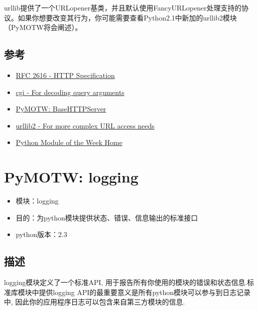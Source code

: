 \documentclass[letterpaper,10pt,english]{manual}
\begin{document}
urllib提供了一个URLopener基类，并且默认使用FancyURLopener处理支持的协议。如果你想要改变其行为，你可能需要查看Python2.1中新加的urllib2模块（PyMOTW将会阐述）。


\subsection{参考}
\begin{itemize}
\item {} 
\href{http://www.faqs.org/rfcs/rfc2616.html}{RFC 2616 - HTTP Specification}

\item {} 
\href{http://docs.python.org/lib/module-cgi.html}{cgi - For decoding query arguments}

\item {} 
\href{http://blog.doughellmann.com/2007/12/pymotw-basehttpserver.html}{PyMOTW: BaseHTTPServer}

\item {} 
\href{http://docs.python.org/lib/module-urllib2.html}{urllib2 - For more complex URL access needs}

\item {} 
\href{http://www.doughellmann.com/projects/PyMOTW/}{Python Module of the Week Home}

\end{itemize}

\resetcurrentobjects


\section{PyMOTW: logging}
\begin{itemize}
\item {} 
模块：logging

\item {} 
目的：为python模块提供状态、错误、信息输出的标准接口

\item {} 
python版本：2.3

\end{itemize}


\subsection{描述}

logging模块定义了一个标准API, 用于报告所有你使用的模块的错误和状态信息.标准库模块中提供logging API的最重要意义是所有python模块可以参与到日志记录中, 因此你的应用程序日志可以包含来自第三方模块的信息.
\end{document}

